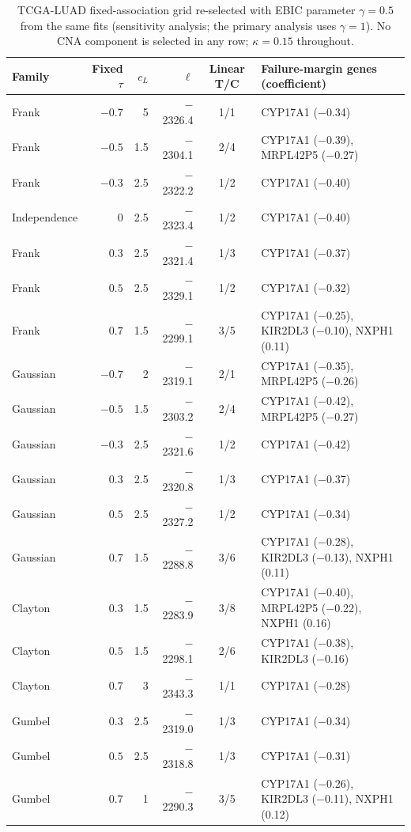 \begin{table}[!htbp]
\centering
\caption{TCGA-LUAD fixed-association grid re-selected with EBIC parameter $\gamma=0.5$ from the same fits (sensitivity analysis; the primary analysis uses $\gamma=1$). No CNA component is selected in any row; $\kappa=0.15$ throughout.}
\label{tab:luad-gamma-half}
\footnotesize
\setlength{\tabcolsep}{4pt}
\begin{tabular}{lrrrcl}
\toprule
Family & Fixed $\tau$ & $c_L$ & $\ell$ & Linear T/C & Failure-margin genes (coefficient)\\
\midrule
Frank & $-0.7$ & 5 & $-$2326.4 & 1/1 & CYP17A1 ($-$0.34) \\
Frank & $-0.5$ & 1.5 & $-$2304.1 & 2/4 & CYP17A1 ($-$0.39), MRPL42P5 ($-$0.27) \\
Frank & $-0.3$ & 2.5 & $-$2322.2 & 1/2 & CYP17A1 ($-$0.40) \\
Independence & $0$ & 2.5 & $-$2323.4 & 1/2 & CYP17A1 ($-$0.40) \\
Frank & $0.3$ & 2.5 & $-$2321.4 & 1/3 & CYP17A1 ($-$0.37) \\
Frank & $0.5$ & 2.5 & $-$2329.1 & 1/2 & CYP17A1 ($-$0.32) \\
Frank & $0.7$ & 1.5 & $-$2299.1 & 3/5 & CYP17A1 ($-$0.25), KIR2DL3 ($-$0.10), NXPH1 (0.11) \\
\addlinespace
Gaussian & $-0.7$ & 2 & $-$2319.1 & 2/1 & CYP17A1 ($-$0.35), MRPL42P5 ($-$0.26) \\
Gaussian & $-0.5$ & 1.5 & $-$2303.2 & 2/4 & CYP17A1 ($-$0.42), MRPL42P5 ($-$0.27) \\
Gaussian & $-0.3$ & 2.5 & $-$2321.6 & 1/2 & CYP17A1 ($-$0.42) \\
Gaussian & $0.3$ & 2.5 & $-$2320.8 & 1/3 & CYP17A1 ($-$0.37) \\
Gaussian & $0.5$ & 2.5 & $-$2327.2 & 1/2 & CYP17A1 ($-$0.34) \\
Gaussian & $0.7$ & 1.5 & $-$2288.8 & 3/6 & CYP17A1 ($-$0.28), KIR2DL3 ($-$0.13), NXPH1 (0.11) \\
\addlinespace
Clayton & $0.3$ & 1.5 & $-$2283.9 & 3/8 & CYP17A1 ($-$0.40), MRPL42P5 ($-$0.22), NXPH1 (0.16) \\
Clayton & $0.5$ & 1.5 & $-$2298.1 & 2/6 & CYP17A1 ($-$0.38), KIR2DL3 ($-$0.16) \\
Clayton & $0.7$ & 3 & $-$2343.3 & 1/1 & CYP17A1 ($-$0.28) \\
\addlinespace
Gumbel & $0.3$ & 2.5 & $-$2319.0 & 1/3 & CYP17A1 ($-$0.34) \\
Gumbel & $0.5$ & 2.5 & $-$2318.8 & 1/3 & CYP17A1 ($-$0.31) \\
Gumbel & $0.7$ & 1 & $-$2290.3 & 3/5 & CYP17A1 ($-$0.26), KIR2DL3 ($-$0.11), NXPH1 (0.12) \\
\bottomrule
\end{tabular}
\end{table}

